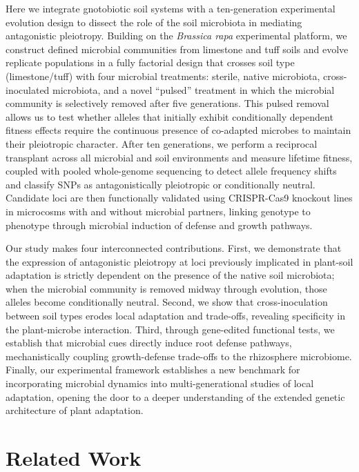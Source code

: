 \documentclass{article}
\begin{document}
Here we integrate gnotobiotic soil systems with a ten-generation experimental evolution design to dissect the role of the soil microbiota in mediating antagonistic pleiotropy. Building on the \emph{Brassica rapa} experimental platform, we construct defined microbial communities from limestone and tuff soils and evolve replicate populations in a fully factorial design that crosses soil type (limestone/tuff) with four microbial treatments: sterile, native microbiota, cross-inoculated microbiota, and a novel ``pulsed'' treatment in which the microbial community is selectively removed after five generations. This pulsed removal allows us to test whether alleles that initially exhibit conditionally dependent fitness effects require the continuous presence of co-adapted microbes to maintain their pleiotropic character. After ten generations, we perform a reciprocal transplant across all microbial and soil environments and measure lifetime fitness, coupled with pooled whole-genome sequencing to detect allele frequency shifts and classify SNPs as antagonistically pleiotropic or conditionally neutral. Candidate loci are then functionally validated using CRISPR-Cas9 knockout lines in microcosms with and without microbial partners, linking genotype to phenotype through microbial induction of defense and growth pathways.

Our study makes four interconnected contributions. First, we demonstrate that the expression of antagonistic pleiotropy at loci previously implicated in plant-soil adaptation is strictly dependent on the presence of the native soil microbiota; when the microbial community is removed midway through evolution, those alleles become conditionally neutral. Second, we show that cross-inoculation between soil types erodes local adaptation and trade-offs, revealing specificity in the plant-microbe interaction. Third, through gene-edited functional tests, we establish that microbial cues directly induce root defense pathways, mechanistically coupling growth-defense trade-offs to the rhizosphere microbiome. Finally, our experimental framework establishes a new benchmark for incorporating microbial dynamics into multi-generational studies of local adaptation, opening the door to a deeper understanding of the extended genetic architecture of plant adaptation.

\section{Related Work}
\end{document}
